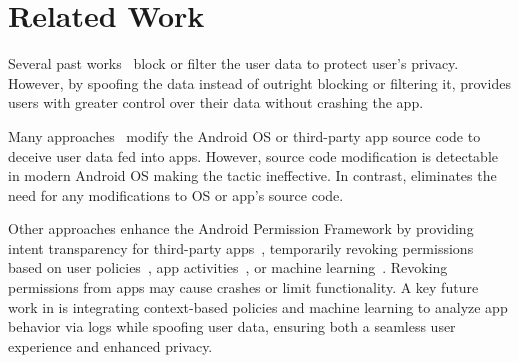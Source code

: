 \section{Related Work}
\label{sec:related_work}

Several past works~\cite{bokhorst2017xprivacy,bokhorst2021xprivacylua,hornyack2011these,ratazzi2019pinpoint,raval2019permissions,shrestha2016slogger} block or filter the user data to protect user's privacy. However, by spoofing the data instead of outright blocking or filtering it, provides users with greater control over their data without crashing the app.

Many approaches~\cite{backes2015boxify,jeon2012dr,raval2016you,smalley2013security,wu2017context} modify the Android OS or third-party app source code to deceive user data fed into apps. However, source code modification is detectable in modern Android OS making the tactic ineffective. In contrast, \framework{} eliminates the need for any modifications to OS or app's source code.

Other approaches enhance the Android Permission Framework by providing intent transparency for third-party apps~\cite{chitkara2017does,tsai2017turtle,conti2011crepe,thanigaivelan2018codra}, temporarily revoking permissions based on user policies~\cite{bugiel2013flexible,liu2016follow,chakraborty2014ipshield}, app activities~\cite{zhang2015leave,chen2013contextual,chen2017sweetdroid,petracca2015audroid}, or machine learning~\cite{olejnik2017smarper,rashidi2016android,wijesekera2017feasibility,fu2017inspired}. Revoking permissions from apps may cause crashes or limit functionality. A key future work in \framework{} is integrating context-based policies and machine learning to analyze app behavior via logs while spoofing user data, ensuring both a seamless user experience and enhanced privacy.
